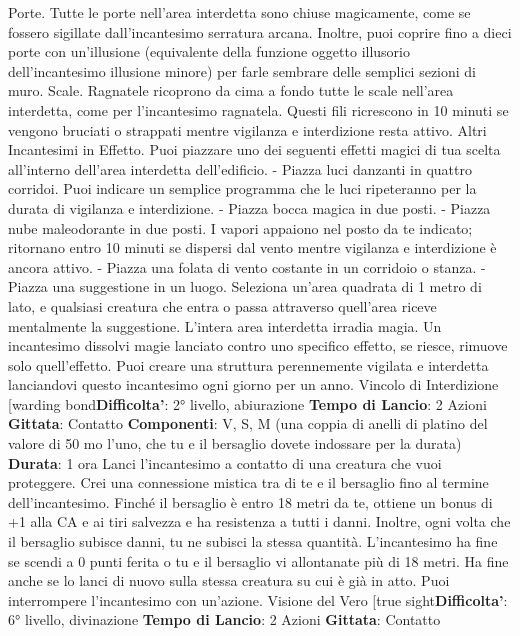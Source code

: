 \begin{multicols}{2}
Porte. Tutte le porte nell’area interdetta sono chiuse
magicamente, come se fossero sigillate
dall’incantesimo serratura arcana. Inoltre, puoi coprire
fino a dieci porte con un’illusione (equivalente della
funzione oggetto illusorio dell’incantesimo illusione
minore) per farle sembrare delle semplici sezioni di
muro.
Scale. Ragnatele ricoprono da cima a fondo tutte le
scale nell’area interdetta, come per l’incantesimo
ragnatela. Questi fili ricrescono in 10 minuti se vengono
bruciati o strappati mentre vigilanza e interdizione resta
attivo.
Altri Incantesimi in Effetto. Puoi piazzare uno dei
seguenti effetti magici di tua scelta all’interno dell’area
interdetta dell’edificio.
- Piazza luci danzanti in quattro corridoi. Puoi indicare
un semplice programma che le luci ripeteranno per
la durata di vigilanza e interdizione.
- Piazza bocca magica in due posti.
- Piazza nube maleodorante in due posti. I vapori
appaiono nel posto da te indicato; ritornano entro 10
minuti se dispersi dal vento mentre vigilanza e
interdizione è ancora attivo.
- Piazza una folata di vento costante in un corridoio o
stanza.
- Piazza una suggestione in un luogo. Seleziona
un’area quadrata di 1 metro di lato, e qualsiasi
creatura che entra o passa attraverso quell’area
riceve mentalmente la suggestione.
L’intera area interdetta irradia magia. Un incantesimo
dissolvi magie lanciato contro uno specifico effetto, se
riesce, rimuove solo quell’effetto.
Puoi creare una struttura perennemente vigilata e
interdetta lanciandovi questo incantesimo ogni giorno
per un anno.
Vincolo di Interdizione
[warding bond\textbf{Difficolta'}:
2° livello, abiurazione
\textbf{Tempo di Lancio}: 2 Azioni
\textbf{Gittata}: Contatto
\textbf{Componenti}: V, S, M (una coppia di anelli di platino del
valore di 50 mo l’uno, che tu e il bersaglio dovete
indossare per la durata)
\textbf{Durata}: 1 ora
Lanci l’incantesimo a contatto di una creatura che vuoi
proteggere. Crei una connessione mistica tra di te e il
bersaglio fino al termine dell’incantesimo. Finché il
bersaglio è entro 18 metri da te, ottiene un bonus di +1
alla CA e ai tiri salvezza e ha resistenza a tutti i danni.
Inoltre, ogni volta che il bersaglio subisce danni, tu ne
subisci la stessa quantità.
L’incantesimo ha fine se scendi a 0 punti ferita o tu e il
bersaglio vi allontanate più di 18 metri. Ha fine anche
se lo lanci di nuovo sulla stessa creatura su cui è già in
atto. Puoi interrompere l’incantesimo con un’azione.
Visione del Vero
[true sight\textbf{Difficolta'}:
6° livello, divinazione
\textbf{Tempo di Lancio}: 2 Azioni
\textbf{Gittata}: Contatto

\end{multicols}
